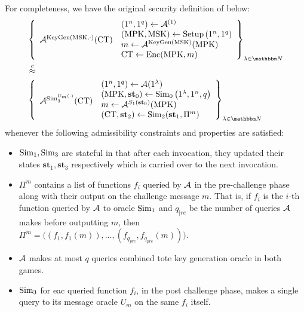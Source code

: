 For completeness, we have the original security definition of \cite{garg2022dynamic} below:
\[
\begin{aligned}
&\left\{
\begin{array}{l}
\vcenter{\hbox{$\advers^{\text{KeyGen}(\MSK, \cdot)}(\mathbf{\FECT})$}}
\end{array}
\begin{array}{l}
\left(1^n, 1^q\right) \leftarrow \advers^{(1)} \\
\left(\MPK, \MSK\right) \leftarrow \text{Setup}\left(1^n, 1^q\right) \\
m \leftarrow \advers^{\text{KeyGen}(\MSK)}(\MPK) \\
\FECT \leftarrow \text{Enc}(\MPK, m)
\end{array}
\right\}_{\lambda \in \N}\\
&\compInd \\
&\left\{
\begin{array}{l}
\vcenter{\hbox{$\advers^{\Sim_3^{U_m(\cdot)}}(\FECT)$}}
\end{array}
\begin{array}{l}
\left(1^n, 1^q\right) \leftarrow \advers{(1^\lambda)} \\
\left(\MPK, \mathbf{st}_0\right) \leftarrow \Sim_0\left(1^\lambda, 1^n, q\right) \\
m \leftarrow \advers^{S_1(\mathbf{st}_0)}(\MPK) \\
\left(\FECT, \mathbf{st}_2\right) \leftarrow \Sim_2(\mathbf{st}_1, \Pi^m)
\end{array}
\right\}_{\lambda \in \N}
\end{aligned}
\]
whenever the following admissibility constraints and properties are satisfied:
\begin{itemize}
	\item $\text{Sim}_1, \text{Sim}_3$ are stateful in that after each invocation, they updated their
	states $\mathbf{st}_1, \mathbf{st}_3$ respectively which is carried over to the next invocation.
	\item $\Pi^m$ contains a list of functions $f_i$ queried by $\mathcal{A}$ in the pre-challenge
	phase along with their output on the challenge message $m$. That is, if $f_i$ is the $i$-th
	function queried by $\mathcal{A}$ to oracle $\text{Sim}_1$ and $q_{[re}$ be the number of queries $\mathcal{A}$
	makes before outputting $m$, then $\Pi^m = \big((f_1, f_1(m)), \dots, (f_{q_{pre}}, f_{q_{pre}}(m))\big)$.
	\item $\mathcal{A}$ makes at most $q$ queries combined tote key generation oracle in both games.
	\item $\text{Sim}_3$ for eac queried function $f_i$, in the post challenge phase, makes a single query to its
	message oracle $U_m$ on the same $f_i$ itself.
\end{itemize}

